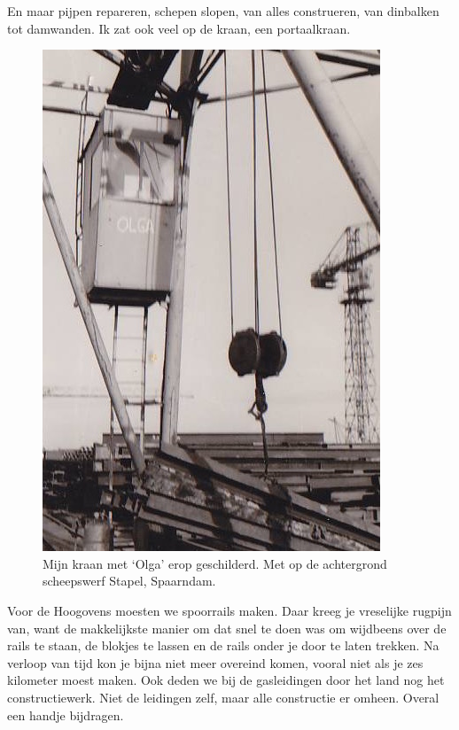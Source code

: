 \documentclass[10pt,twoside, openright]{memoir}
\begin{document}
En maar pijpen repareren, schepen slopen, van alles construeren, van dinbalken tot damwanden. Ik zat ook veel op de kraan, een portaalkraan. 

\begin{figure}
\includegraphics[width=\textwidth]{img/ch38/joho_0011}
\caption*{\footnotesize Mijn kraan met ‘Olga’ erop geschilderd. Met op de achtergrond scheepswerf Stapel, Spaarndam.}
\end{figure}

Voor de Hoogovens moesten we spoorrails maken. Daar kreeg je vreselijke rugpijn van, want de makkelijkste manier om dat snel te doen was om wijdbeens over de rails te staan, de blokjes te lassen en de rails onder je door te laten trekken. Na verloop van tijd kon je bijna niet meer overeind komen, vooral niet als je zes kilometer moest maken. Ook deden we bij de gasleidingen door het land nog het constructiewerk. Niet de leidingen zelf, maar alle constructie er omheen. Overal een handje bijdragen.
\end{document}
